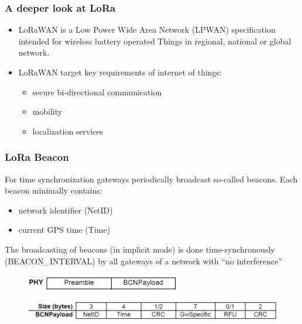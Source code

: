 \begin{frame}[fragile]
  \frametitle{A deeper look at LoRa}
  \begin{itemize}
      \item LoRaWAN is a Low Power Wide Area Network (LPWAN) specification intended for wireless battery operated Things in regional, national or global network. 
      \item LoRaWAN target key requirements of internet of things:
      \begin{itemize}
      	\item secure bi-directional communication
      	\item mobility
      	\item localization services 
      \end{itemize}
  \end{itemize}
\end{frame}

\begin{frame}[fragile]
  \frametitle{LoRa Beacon}
  For time synchronization gateways periodically broadcast so-called beacons. Each beacon
  minimally contains:
  \begin{itemize}
      \item network identifier (NetID)
      \item current GPS time (Time)
      \end{itemize}
      The broadcasting of beacons (in implicit mode) is done time-synchronously (BEACON\_INTERVAL) by all gateways of a network with \textquotedblleft no interference\textquotedblright
      \begin{figure}
  \centering
  \includegraphics[width=0.6\textwidth]{img/general_lora_beaconing.png}
\end{figure}
  \begin{figure}
  	\centering
  \includegraphics[width=\textwidth]{img/lora_beaconing.png}
  \end{figure}
\end{frame}


